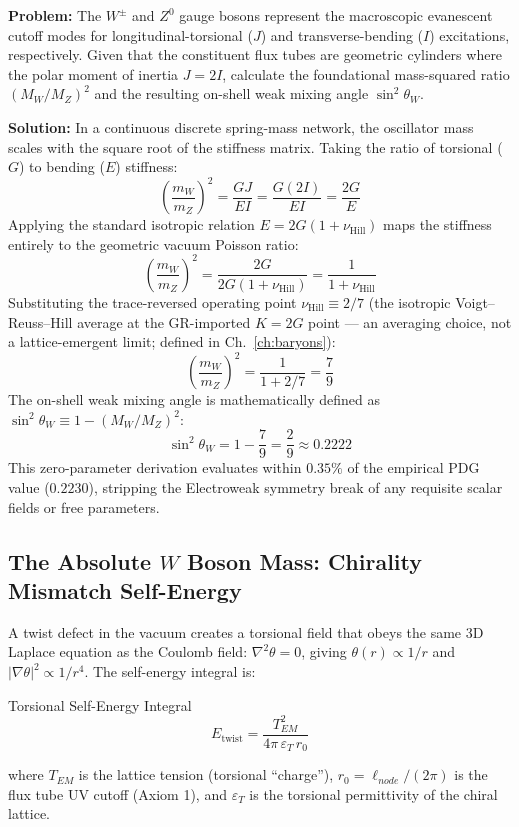 \begin{examplebox}
\textbf{Problem:} The $W^{\pm}$ and $Z^0$ gauge bosons represent the macroscopic evanescent cutoff modes for longitudinal-torsional ($J$) and transverse-bending ($I$) excitations, respectively. Given that the constituent flux tubes are geometric cylinders where the polar moment of inertia $J=2I$, calculate the foundational mass-squared ratio $(M_W/M_Z)^2$ and the resulting on-shell weak mixing angle $\sin^2\theta_W$.

\textbf{Solution:} In a continuous discrete spring-mass network, the oscillator mass scales with the square root of the stiffness matrix. Taking the ratio of torsional ($G$) to bending ($E$) stiffness:
\[ \left(\frac{m_W}{m_Z}\right)^2 = \frac{GJ}{EI} = \frac{G(2I)}{EI} = \frac{2G}{E} \]
Applying the standard isotropic relation $E = 2G(1+\nu_{\text{Hill}})$ maps the stiffness entirely to the geometric vacuum Poisson ratio:
\[ \left(\frac{m_W}{m_Z}\right)^2 = \frac{2G}{2G(1+\nu_{\text{Hill}})} = \frac{1}{1+\nu_{\text{Hill}}} \]
Substituting the trace-reversed operating point $\nu_{\text{Hill}} \equiv 2/7$ (the isotropic Voigt--Reuss--Hill average at the GR-imported $K = 2G$ point --- an averaging choice, not a lattice-emergent limit; defined in Ch.~\ref{ch:baryons}):
\[ \left(\frac{m_W}{m_Z}\right)^2 = \frac{1}{1+2/7} = \frac{7}{9} \]
The on-shell weak mixing angle is mathematically defined as $\sin^2\theta_W \equiv 1 - (M_W/M_Z)^2$:
\[ \sin^2\theta_W = 1 - \frac{7}{9} = \frac{2}{9} \approx 0.2222 \]
This zero-parameter derivation evaluates within $0.35\%$ of the empirical PDG value ($0.2230$), stripping the Electroweak symmetry break of any requisite scalar fields or free parameters.
\end{examplebox}

\subsection{The Absolute $W$ Boson Mass: Chirality Mismatch Self-Energy}

A twist defect in the vacuum creates a torsional field that obeys the same 3D Laplace equation as the Coulomb field: $\nabla^2\theta = 0$, giving $\theta(r) \propto 1/r$ and $|\nabla\theta|^2 \propto 1/r^4$. The self-energy integral is:
\begin{resultbox}{Torsional Self-Energy Integral}
\begin{equation}
    E_{\text{twist}} = \frac{T_{EM}^2}{4\pi\,\varepsilon_T\, r_0}
\end{equation}
\end{resultbox}
where $T_{EM}$ is the lattice tension (torsional ``charge''), $r_0 = \ell_{node}/(2\pi)$ is the flux tube UV cutoff (Axiom 1), and $\varepsilon_T$ is the torsional permittivity of the chiral lattice.

